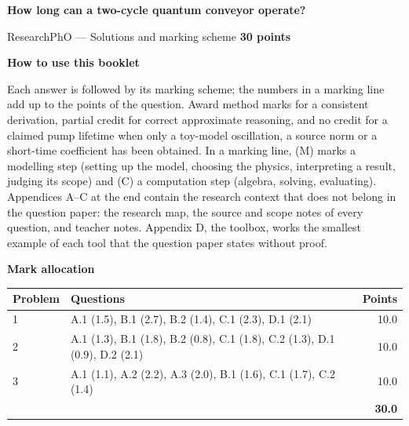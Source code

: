 \documentclass[11pt,a4paper]{article}
\newcommand{\smallheading}[1]{\par\Needspace{6\baselineskip}\medskip\textbf{#1}\par}
\newcommand{\pagecode}{G}
\begin{document}
\renewcommand{\pagecode}{S0}
{\LARGE\bfseries\color{ink}How long can a two-cycle quantum conveyor operate?}\par
{\large ResearchPhO --- Solutions and marking scheme \hfill \textbf{30 points}}
\smallheading{How to use this booklet}
Each answer is followed by its marking scheme; the numbers in a marking line add up to the points of the question. Award method marks for a consistent derivation, partial credit for correct approximate reasoning, and no credit for a claimed pump lifetime when only a toy-model oscillation, a source norm or a short-time coefficient has been obtained. In a marking line, (M) marks a modelling step (setting up the model, choosing the physics, interpreting a result, judging its scope) and (C) a computation step (algebra, solving, evaluating). Appendices A--C at the end contain the research context that does not belong in the question paper: the research map, the source and scope notes of every question, and teacher notes. Appendix D, the toolbox, works the smallest example of each tool that the question paper states without proof.
\smallheading{Mark allocation}
{\small \begin{tabularx}{\textwidth}{@{}p{18mm}Y r@{}}\toprule
Problem&Questions&Points\\&A.1 (1.5), B.1 (2.7), B.2 (1.4), C.1 (2.3), D.1 (2.1)&10.0\\
2&A.1 (1.3), B.1 (1.8), B.2 (0.8), C.1 (1.8), C.2 (1.3), D.1 (0.9), D.2 (2.1)&10.0\\
3&A.1 (1.1), A.2 (2.2), A.3 (2.0), B.1 (1.6), C.1 (1.7), C.2 (1.4)&10.0\\
\midrule&&\textbf{30.0}\\\bottomrule
\end{tabularx}}
\end{document}

